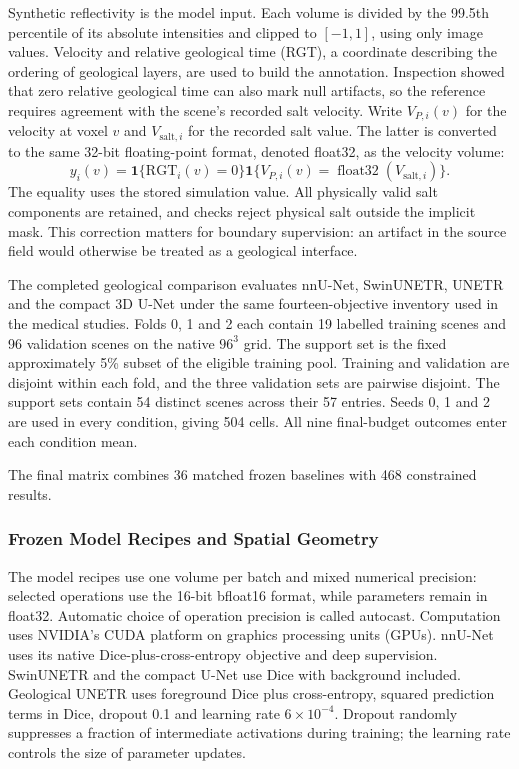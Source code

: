 \documentclass[12pt,a4paper]{article}
\begin{document}
Synthetic reflectivity is the model input. Each volume is divided by
the 99.5th percentile of its absolute intensities and clipped to
$[-1,1]$, using only image values. Velocity and relative geological time (RGT), a coordinate describing
the ordering of geological layers, are used to build the annotation. Inspection showed that zero
relative geological time can also mark null artifacts, so the reference
requires agreement with the scene's recorded salt velocity. Write
$V_{P,i}(v)$ for the velocity at voxel $v$ and $V_{\mathrm{salt},i}$
for the recorded salt value. The latter is converted to the same
32-bit floating-point format, denoted float32, as the velocity volume:
\begin{equation}
 y_i(v)=\mathbf{1}\{\mathrm{RGT}_i(v)=0\}
        \mathbf{1}\{V_{P,i}(v)=\operatorname{float32}(V_{\mathrm{salt},i})\}.
\label{eq:geo-reference-construction}
\end{equation}
The equality uses the stored simulation value. All physically valid
salt components are retained, and checks reject physical salt outside
the implicit mask. This correction matters for boundary supervision:
an artifact in the source field would otherwise be treated as a
geological interface.


The completed geological comparison evaluates nnU-Net, SwinUNETR,
UNETR and the compact 3D U-Net under the same fourteen-objective
inventory used in the medical studies. Folds 0, 1 and 2 each contain
19 labelled training scenes and 96 validation scenes on the native
$96^3$ grid. The support set is the fixed approximately 5\% subset
of the eligible training pool. Training and validation are disjoint
within each fold, and the three validation sets are pairwise disjoint.
The support sets contain 54 distinct scenes across their 57 entries.
Seeds 0, 1 and 2 are used in every condition, giving 504 cells.
All nine final-budget outcomes enter each condition mean.

The final matrix combines 36 matched frozen baselines with 468
constrained results. 

\subsubsection{Frozen Model Recipes and Spatial Geometry}

The model recipes use one volume per batch and mixed numerical precision:
selected operations use the 16-bit bfloat16 format, while parameters remain
in float32. Automatic choice of operation precision is called autocast.
Computation uses NVIDIA's CUDA platform on graphics processing units (GPUs).
nnU-Net uses its native Dice-plus-cross-entropy objective and deep
supervision. SwinUNETR and the compact U-Net use Dice with background
included. Geological UNETR uses foreground Dice plus cross-entropy, squared
prediction terms in Dice, dropout 0.1 and learning rate $6\times10^{-4}$.
Dropout randomly suppresses a fraction of intermediate activations during
training; the learning rate controls the size of parameter updates.
\end{document}
